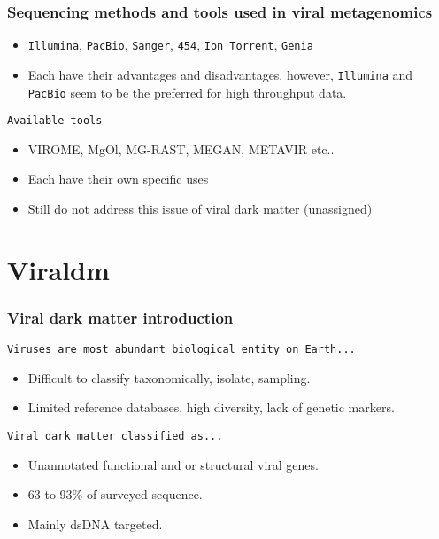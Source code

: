 \documentclass{beamer}
\begin{document}
\begin{frame}[fragile]
\frametitle{Sequencing methods and tools used in viral metagenomics}

\begin{itemize}
\item \texttt{Illumina}, \texttt{PacBio}, \texttt{Sanger}, \texttt{454}, \texttt{Ion Torrent}, \texttt{Genia}
\item Each have their advantages and disadvantages, however, \texttt{Illumina} and \texttt{PacBio} seem to be the          	  preferred for high throughput data.  
\end{itemize}


\begin{block}{\texttt{Available tools}}

\begin{itemize}
  \item VIROME, MgOl, MG-RAST, MEGAN, METAVIR etc.. 
  \item Each have their own specific uses
  \item Still do not address this issue of viral dark matter (unassigned)
\end{itemize}
\end{block}
\end{frame}

\section{Viraldm}

\begin{frame}[fragile]
\frametitle{Viral dark matter introduction}
\texttt{Viruses are most abundant biological entity on Earth...}

\begin{itemize}
\item Difficult to classify taxonomically, isolate, sampling.  
\item Limited reference databases, high diversity, lack of genetic markers. 
\end{itemize}

\texttt{Viral dark matter classified as...}
\begin{itemize}
\item Unannotated functional and or structural viral genes.
\item 63 to 93\% of surveyed sequence.
\item Mainly dsDNA targeted.
\end{itemize}


\end{frame}
\end{document}
